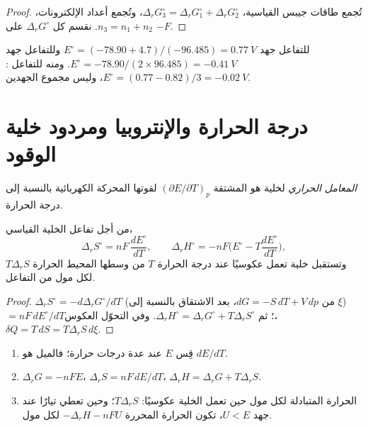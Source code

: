 \begin{proof}
تُجمع طاقات جيبس القياسية، $\Delta_r G_3^\circ = \Delta_r G_1^\circ + \Delta_r
G_2^\circ$، وتُجمع أعداد الإلكترونات، $n_3 = n_1 + n_2$. نقسم كل $\Delta_r
G^\circ$ على $-F$.
\end{proof}

\begin{example}\label{ex:b2:cell-thermodynamics:iron}
للتفاعل  جهد $E^\circ = (-78.90 + 4.7)/(-96.485) = \qty{0.77}{V}$
وللتفاعل  جهد $E^\circ = -78.90/(2 \times 96.485) =
\qty{-0.41}{V}$. ومنه للتفاعل : $E^\circ = (0.77 - 0.82)/3 =
\qty{-0.02}{V}$، وليس مجموع الجهدين.
\end{example}

\section{درجة الحرارة والإنتروبيا ومردود خلية الوقود}

\begin{definition}\label{def:b2:cell-thermodynamics:temperature-coefficient}
\emph{المعامل الحراري} لخلية هو
المشتقة $(\partial E/\partial T)_p$ لقوتها المحركة الكهربائية بالنسبة
إلى درجة الحرارة.
\end{definition}

\begin{proposition}\label{prop:b2:cell-thermodynamics:entropy}
من أجل تفاعل الخلية القياسي،
\[
  \Delta_r S^\circ = nF\,\frac{dE^\circ}{dT}, \qquad
  \Delta_r H^\circ = -nF\Big(E^\circ - T\frac{dE^\circ}{dT}\Big),
\]
وتستقبل خلية تعمل عكوسيًا عند درجة الحرارة $T$ من وسطها
المحيط الحرارة $T\Delta_r S$ لكل مول من التفاعل.
\end{proposition}

\begin{proof}
$\Delta_r S^\circ = -d\Delta_r G^\circ/dT$ (من $dG = -S\,dT + V\,dp$، بعد الاشتقاق
بالنسبة إلى $\xi$) $= nF\,dE^\circ/dT$؛ ثم $\Delta_r H^\circ = \Delta_r G^\circ
+ T\Delta_r S^\circ$. وفي التحوّل العكوس، $\delta Q = T\,dS = T\Delta_r S\,
d\xi$.
\end{proof}

\begin{method}\label{met:b2:cell-thermodynamics:cell-data}
\begin{enumerate}
  \item قِس $E$ عند عدة درجات حرارة؛ فالميل هو $dE/dT$.
  \item $\Delta_r G = -nFE$، $\Delta_r S = nF\,dE/dT$، $\Delta_r H = \Delta_r G +
        T\Delta_r S$.
  \item الحرارة المتبادلة لكل مول حين تعمل الخلية عكوسيًا: $T\Delta_r S$؛
        وحين تعطي تيارًا عند جهد $U < E$، تكون الحرارة المحررة
        $-\Delta_r H - nFU$ لكل مول.
\end{enumerate}
\end{method}

